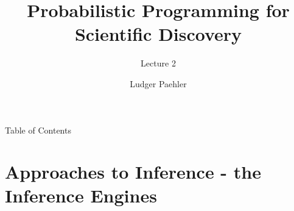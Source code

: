 \documentclass[AERbeamer%
              ,optEnglish%
              ,optBiber%
              ,optBibstyleAlphabetic%
              ,optBeamerClassicFormat%
              ]{AERlatex}%
\title{Probabilistic Programming for Scientific Discovery}%
\subtitle{Lecture 2}
\author{Ludger Paehler}%
\date{\AERutilsDate{29}{7}{2020}}%
\institute{Lviv Data Science Summer School}%
\begin{document}
%
%
\AERbeamerTitlePageDefault%
%
%

\begin{frame}{Table of Contents}{}%
    \tableofcontents
\end{frame}%


\section{Approaches to Inference - the Inference Engines}


\end{document}
